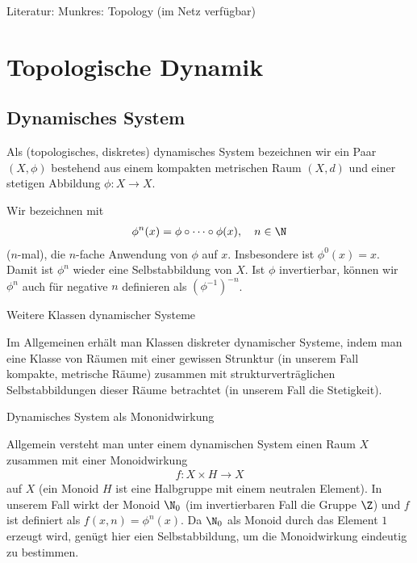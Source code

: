 
Literatur: Munkres: Topology (im Netz verfügbar)

\section{Topologische Dynamik}
\subsection{Dynamisches System}

\begin{definition}
Als (topologisches, diskretes) dynamisches System bezeichnen wir ein Paar $(X, \phi)$ bestehend aus einem kompakten metrischen Raum $(X,d)$ und einer stetigen Abbildung $\phi: X \to X.$

Wir bezeichnen mit 
\begin{align*}
\phi^n(x) = \phi \circ \dots \circ \phi(x), \quad n \in \N
\end{align*}
($n$-mal), die $n$-fache Anwendung von $\phi$ auf $x$. Insbesondere ist $\phi^0(x) = x$. Damit ist $\phi^n$ wieder eine Selbstabbildung von $X$. Ist $\phi$ invertierbar, können wir $\phi^n$ auch für negative $n$ definieren als $(\phi^{-1})^{-n}$.
\end{definition}

\begin{bemerkung} Weitere Klassen dynamischer Systeme

Im Allgemeinen erhält man Klassen diskreter dynamischer Systeme, indem man eine Klasse von Räumen mit einer gewissen Strunktur (in unserem Fall kompakte, metrische Räume) zusammen mit strukturverträglichen Selbstabbildungen dieser Räume betrachtet (in unserem Fall die Stetigkeit).
\end{bemerkung}

\begin{bemerkung} Dynamisches System als Mononidwirkung

Allgemein versteht man unter einem dynamischen System einen Raum $X$ zusammen mit einer Monoidwirkung 
\begin{align*}
  f: X \times H \to X
\end{align*}
auf $X$ (ein Monoid $H$ ist eine Halbgruppe mit einem neutralen Element). In unserem Fall wirkt der Monoid $\N_0$ (im invertierbaren Fall die Gruppe $\Z$) und $f$ ist definiert als $f(x,n)=\phi^n(x)$. Da $\N_0$ als Monoid durch das Element $1$ erzeugt wird, genügt hier eien Selbstabbildung, um die Monoidwirkung eindeutig zu bestimmen.
\end{bemerkung}

